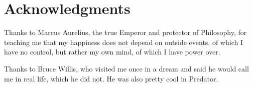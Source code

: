 \section*{Acknowledgments} %


Thanks to Marcus Aurelius, the true Emperor and protector of Philosophy, for teaching me that my happiness does not depend on outside events, of which I have no control, but rather my own mind, of which I have power over.


Thanks to Bruce Willis, who visited me once in a dream and said he would call me in real life, which he did not. He was also pretty cool in Predator.
